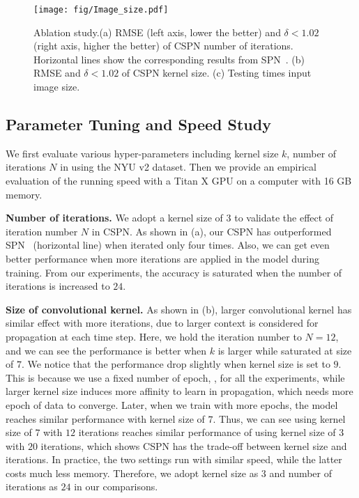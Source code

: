 


\begin{figure}[t]
\centering
\texttt{[image: fig/Image\_size.pdf]}
\caption{Ablation study.(a) RMSE (left axis, lower the better) and $\delta < 1.02$ (right axis, higher the better) of CSPN \wrt number of iterations. Horizontal lines show the corresponding results from SPN~\cite{liu2017learning}. (b) RMSE and $\delta < 1.02$ of CSPN \wrt kernel size. (c) Testing times \wrt input image size.}
\label{fig:ab_study}
\end{figure}

\subsection{Parameter Tuning and Speed Study}
\label{subsec:ablation}
We first evaluate various hyper-parameters including kernel size $k$, number of iterations $N$ in  using the NYU v2 dataset. Then we provide an empirical evaluation of the running speed with a Titan X GPU on a computer with 16 GB memory.

\noindent\textbf{Number of iterations.} We adopt a kernel size of $3$ to validate the effect of iteration number $N$ in CSPN. 
As shown in  (a), our CSPN has outperformed SPN~\cite{liu2017learning} (horizontal line) when iterated only four times. Also, we can get even better performance when more iterations are applied in the model during training. From our experiments, the accuracy is saturated when the number of iterations is increased to $24$. 

\noindent\textbf{Size of convolutional kernel.} As shown in  (b), larger convolutional kernel has similar effect with more iterations, due to larger context is considered for propagation at each time step. Here, we hold the iteration number to $N = 12$, and we can see the performance is better when $k$ is larger while saturated at size of $7$. 
We notice that the performance drop slightly when kernel size is set to $9$. This is because we use a fixed number of epoch, , for all the experiments, while larger kernel size induces more affinity to learn in propagation, which needs more epoch of data to converge. Later, when we train with more epochs, the model reaches similar performance with kernel size of $7$.
Thus, we can see using kernel size of $7$ with $12$ iterations reaches similar performance of using kernel size of $3$ with $20$ iterations, which shows CSPN has the trade-off between kernel size and iterations. In practice, the two settings run with similar speed, while the latter costs much less memory. Therefore, we adopt kernel size as $3$ and number of iterations as $24$ in our comparisons.

